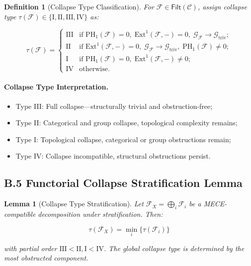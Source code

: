 \documentclass[11pt]{article}
\newtheorem{definition}[theorem]{Definition}
\newtheorem{lemma}[theorem]{Lemma}
\begin{document}
\begin{definition}[Collapse Type Classification]
For \( \mathcal{F} \in \mathsf{Filt}(\mathcal{C}) \), assign collapse type \( \tau(\mathcal{F}) \in \{\mathrm{I}, \mathrm{II}, \mathrm{III}, \mathrm{IV}\} \) as:

\[
\tau(\mathcal{F}) =
\begin{cases}
\mathrm{III} & \text{if } \mathrm{PH}_1(\mathcal{F}) = 0, \; \mathrm{Ext}^1(\mathcal{F}, -) = 0, \; \mathcal{G}_{\mathcal{F}} \longrightarrow \mathcal{G}_{\mathrm{triv}}; \\
\mathrm{II}  & \text{if } \mathrm{Ext}^1(\mathcal{F}, -) = 0, \; \mathcal{G}_{\mathcal{F}} \longrightarrow \mathcal{G}_{\mathrm{triv}}, \; \mathrm{PH}_1(\mathcal{F}) \neq 0; \\
\mathrm{I}   & \text{if } \mathrm{PH}_1(\mathcal{F}) = 0, \; \mathrm{Ext}^1(\mathcal{F}, -) \neq 0; \\
\mathrm{IV}  & \text{otherwise}.
\end{cases}
\]
\end{definition}

\paragraph{Collapse Type Interpretation.}

\begin{itemize}
    \item Type III: Full collapse—structurally trivial and obstruction-free;
    \item Type II: Categorical and group collapse, topological complexity remains;
    \item Type I: Topological collapse, categorical or group obstructions remain;
    \item Type IV: Collapse incompatible, structural obstructions persist.
\end{itemize}

\subsection*{B.5 Functorial Collapse Stratification Lemma}

\begin{lemma}[Collapse Type Stratification]
Let \( \mathcal{F}_X = \bigoplus_i \mathcal{F}_i \) be a MECE-compatible decomposition under stratification. Then:

\[
\tau(\mathcal{F}_X) = \min_i \{ \tau(\mathcal{F}_i) \}
\]

with partial order \( \mathrm{III} < \mathrm{II}, \mathrm{I} < \mathrm{IV} \). The global collapse type is determined by the most obstructed component.

\end{lemma}
\end{document}
